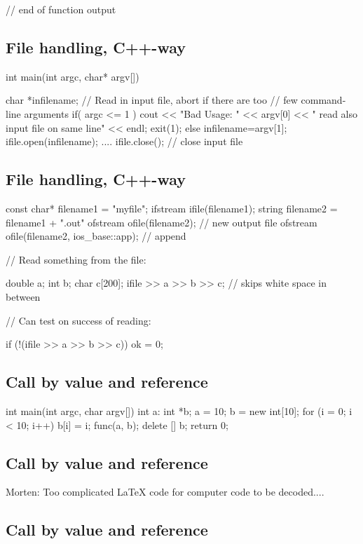 \documentclass[%
twoside,                 %
final,                   %
10pt]{article}
\begin{document}
{{{{{}  // end of function output
\ecppcod

\subsection{File handling, C++-way}

\bcppcod
int main(int argc, char* argv[])
{
  char *infilename;
  // Read in input file, abort if there are too
  // few command-line arguments
  if( argc <= 1 ){
    cout << "Bad Usage: " << argv[0] <<
      " read also input file on same line" << endl;
    exit(1);
  }
  else{
    infilename=argv[1];
  }
  ifile.open(infilename);
  ....
  ifile.close();  // close input file
\ecppcod

\subsection{File handling, C++-way}

\bcppcod
const char* filename1 = "myfile";
ifstream ifile(filename1);
string filename2 = filename1 + ".out"
ofstream ofile(filename2);  // new output file
ofstream ofile(filename2, ios_base::app);  // append

//      Read something from the file:

double a; int b; char c[200];
ifile >> a >> b >> c;  // skips white space in between

//      Can test on success of reading:

if (!(ifile >> a >> b >> c)) ok = 0;
\ecppcod

\subsection{Call by value and reference}

\bcppcod
int main(int argc, char argv[]) {
int  a:
int *b;
a = 10;
b = new int[10];
for (i = 0; i < 10; i++) {
  b[i] = i;
}
func(a, b);
delete [] b;
return 0;
}
\ecppcod

\subsection{Call by value and reference}

Morten: Too complicated {\LaTeX} code for computer code to be
decoded....

\subsection{Call by value and reference}

}}}}}
\end{document}
